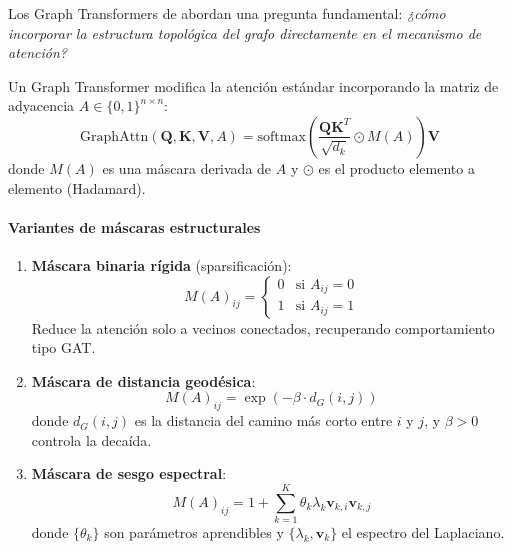 Los Graph \glspl{Transformer} de \citet{dwivedi2021generalization} abordan una pregunta fundamental: \textit{¿cómo incorporar la estructura topológica del grafo directamente en el mecanismo de atención?}

\begin{definition}\label{def:graph_transformer_bias}
Un Graph \gls{Transformer} modifica la atención estándar incorporando la matriz de adyacencia $A \in \{0,1\}^{n \times n}$:
\begin{equation}
    \text{GraphAttn}(\mathbf{Q}, \mathbf{K}, \mathbf{V}, A) = \text{softmax}\left(\frac{\mathbf{Q}\mathbf{K}^T}{\sqrt{d_k}} \odot M(A)\right)\mathbf{V}
    \label{eq:graph_transformer_masked_attention}
\end{equation}
donde $M(A)$ es una máscara derivada de $A$ y $\odot$ es el producto elemento a elemento (Hadamard).
\end{definition}

\paragraph{Variantes de máscaras estructurales}

\begin{enumerate}
    \item \textbf{Máscara binaria rígida} (sparsificación):
    \begin{equation}
        M(A)_{ij} = \begin{cases}
            0 & \text{si } A_{ij} = 0 \\
            1 & \text{si } A_{ij} = 1
        \end{cases}
        \label{eq:binary_mask}
    \end{equation}
    Reduce la atención solo a vecinos conectados, recuperando comportamiento tipo \gls{GAT}.

    \item \textbf{Máscara de distancia geodésica}:
    \begin{equation}
        M(A)_{ij} = \exp\left(-\beta \cdot d_G(i,j)\right)
        \label{eq:geodesic_mask}
    \end{equation}
    donde $d_G(i,j)$ es la distancia del camino más corto entre $i$ y $j$, y $\beta > 0$ controla la decaída.

    \item \textbf{Máscara de sesgo espectral}:
    \begin{equation}
        M(A)_{ij} = 1 + \sum_{k=1}^{K} \theta_k \lambda_k \mathbf{v}_{k,i} \mathbf{v}_{k,j}
        \label{eq:spectral_bias_mask}
    \end{equation}
    donde $\{\theta_k\}$ son parámetros aprendibles y $\{\lambda_k, \mathbf{v}_k\}$ el espectro del Laplaciano.
\end{enumerate}

